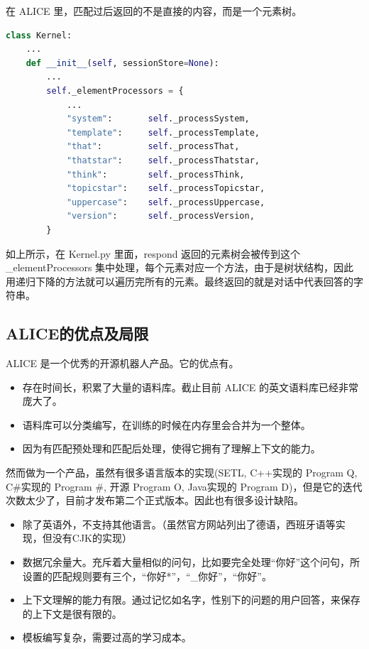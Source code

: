 \documentclass[bachelor,winfonts]{jnuthesis}
\begin{document}
在 ALICE 里，匹配过后返回的不是直接的内容，而是一个元素树。

\begin{lstlisting}[language=Python]
class Kernel:
    ...
    def __init__(self, sessionStore=None):
        ...
        self._elementProcessors = {
            ...
            "system":       self._processSystem,
            "template":     self._processTemplate,
            "that":         self._processThat,
            "thatstar":     self._processThatstar,
            "think":        self._processThink,
            "topicstar":    self._processTopicstar,
            "uppercase":    self._processUppercase,
            "version":      self._processVersion,
        }
\end{lstlisting}

如上所示，在 Kernel.py 里面，respond 返回的元素树会被传到这个 \_elementProcessors 集中处理，每个元素对应一个方法，由于是树状结构，因此用递归下降的方法就可以遍历完所有的元素。最终返回的就是对话中代表回答的字符串。



\subsection{ALICE的优点及局限}
ALICE 是一个优秀的开源机器人产品。它的优点有。

\begin{itemize}
\item 存在时间长，积累了大量的语料库。截止目前 ALICE 的英文语料库已经非常庞大了。
\item 语料库可以分类编写，在训练的时候在内存里会合并为一个整体。
\item 因为有匹配预处理和匹配后处理，使得它拥有了理解上下文的能力。
\end{itemize}

然而做为一个产品，虽然有很多语言版本的实现(SETL, C++实现的 Program Q, C\#实现的 Program \#, 开源 Program O, Java实现的 Program D)，但是它的迭代次数太少了，目前才发布第二个正式版本。因此也有很多设计缺陷。

\begin{itemize}
\item 除了英语外，不支持其他语言。（虽然官方网站列出了德语，西班牙语等实现，但没有CJK的实现）
\item 数据冗余量大。充斥着大量相似的问句，比如要完全处理“你好”这个问句，所设置的匹配规则要有三个，“你好*”，“\_你好”，“你好”。
\item 上下文理解的能力有限。通过记忆如名字，性别下的问题的用户回答，来保存的上下文是很有限的。
\item 模板编写复杂，需要过高的学习成本。
\end{itemize}
\end{document}
